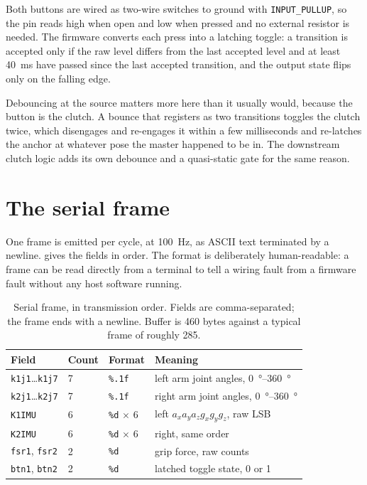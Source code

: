 Both buttons are wired as two-wire switches to ground with
\texttt{INPUT\_PULLUP}, so the pin reads high when open and low when pressed
and no external resistor is needed. The firmware converts each press into a
latching toggle: a transition is accepted only if the raw level differs from
the last accepted level and at least \SI{40}{\milli\second} have passed since
the last accepted transition, and the output state flips only on the falling
edge.

Debouncing at the source matters more here than it usually would, because the
button is the clutch. A bounce that registers as two transitions toggles the
clutch twice, which disengages and re-engages it within a few milliseconds and
re-latches the anchor at whatever pose the master happened to be in. The
downstream clutch logic adds its own debounce and a quasi-static gate for the
same reason.

\section{The serial frame}

One frame is emitted per cycle, at \SI{100}{\hertz}, as ASCII text terminated
by a newline.  gives the fields in order. The format is
deliberately human-readable: a frame can be read directly from a terminal to
tell a wiring fault from a firmware fault without any host software running.

\begin{table}[htbp]
  \centering
  \caption{Serial frame, in transmission order. Fields are comma-separated;
  the frame ends with a newline. Buffer is \num{460} bytes against a typical
  frame of roughly \num{285}.}
  \label{tab:frame}
  \begin{tabular}{@{}llll@{}}
    \toprule
    Field & Count & Format & Meaning \\
    \midrule
    \texttt{k1j1}\ldots\texttt{k1j7} & 7 & \texttt{\%.1f}
      & left arm joint angles, \SIrange{0}{360}{\degree} \\
    \texttt{k2j1}\ldots\texttt{k2j7} & 7 & \texttt{\%.1f}
      & right arm joint angles, \SIrange{0}{360}{\degree} \\
    \texttt{K1IMU} & 6 & \texttt{\%d} $\times$ 6
      & left $a_x a_y a_z g_x g_y g_z$, raw LSB \\
    \texttt{K2IMU} & 6 & \texttt{\%d} $\times$ 6
      & right, same order \\
    \texttt{fsr1}, \texttt{fsr2} & 2 & \texttt{\%d}
      & grip force, raw counts \\
    \texttt{btn1}, \texttt{btn2} & 2 & \texttt{\%d}
      & latched toggle state, \num{0} or \num{1} \\
    \bottomrule
  \end{tabular}
\end{table}


